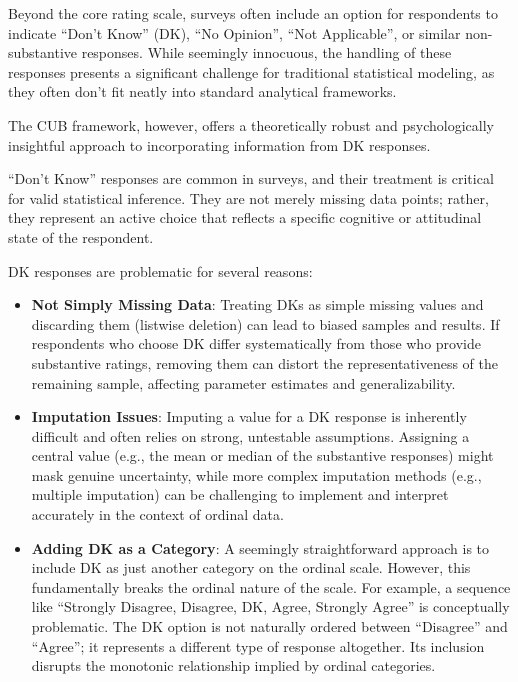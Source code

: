 \documentclass[
  letterpaper,
  DIV=11,
  numbers=noendperiod]{scrartcl}
\begin{document}
Beyond the core rating scale, surveys often include an option for
respondents to indicate ``Don't Know'' (DK), ``No Opinion'', ``Not
Applicable'', or similar non-substantive responses. While seemingly
innocuous, the handling of these responses presents a significant
challenge for traditional statistical modeling, as they often don't fit
neatly into standard analytical frameworks.

The CUB framework, however, offers a theoretically robust and
psychologically insightful approach to incorporating information from DK
responses.

``Don't Know'' responses are common in surveys, and their treatment is
critical for valid statistical inference. They are not merely missing
data points; rather, they represent an active choice that reflects a
specific cognitive or attitudinal state of the respondent.

DK responses are problematic for several reasons:

\begin{itemize}
\item
  \textbf{Not Simply Missing Data}: Treating DKs as simple missing
  values and discarding them (listwise deletion) can lead to biased
  samples and results. If respondents who choose DK differ
  systematically from those who provide substantive ratings, removing
  them can distort the representativeness of the remaining sample,
  affecting parameter estimates and generalizability.
\item
  \textbf{Imputation Issues}: Imputing a value for a DK response is
  inherently difficult and often relies on strong, untestable
  assumptions. Assigning a central value (e.g., the mean or median of
  the substantive responses) might mask genuine uncertainty, while more
  complex imputation methods (e.g., multiple imputation) can be
  challenging to implement and interpret accurately in the context of
  ordinal data.
\item
  \textbf{Adding DK as a Category}: A seemingly straightforward approach
  is to include DK as just another category on the ordinal scale.
  However, this fundamentally breaks the ordinal nature of the scale.
  For example, a sequence like ``Strongly Disagree, Disagree, DK, Agree,
  Strongly Agree'' is conceptually problematic. The DK option is not
  naturally ordered between ``Disagree'' and ``Agree''; it represents a
  different type of response altogether. Its inclusion disrupts the
  monotonic relationship implied by ordinal categories.
\end{itemize}
\end{document}
